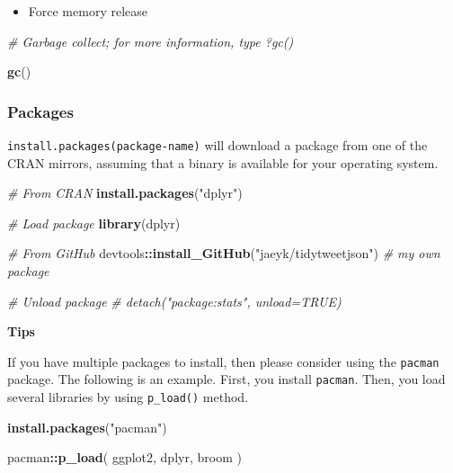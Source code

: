 \documentclass[
]{book}
\newenvironment{Shaded}{\begin{snugshade}}{\end{snugshade}}
\newcommand{\CommentTok}[1]{\textcolor[rgb]{0.56,0.35,0.01}{\textit{#1}}}
\newcommand{\FunctionTok}[1]{\textcolor[rgb]{0.13,0.29,0.53}{\textbf{#1}}}
\newcommand{\NormalTok}[1]{#1}
\newcommand{\SpecialCharTok}[1]{\textcolor[rgb]{0.81,0.36,0.00}{\textbf{#1}}}
\newcommand{\StringTok}[1]{\textcolor[rgb]{0.31,0.60,0.02}{#1}}
\providecommand{\tightlist}{%
  \setlength{\itemsep}{0pt}\setlength{\parskip}{0pt}}
\begin{document}
\begin{itemize}
\tightlist
\item
  Force memory release
\end{itemize}

\begin{Shaded}
\begin{Highlighting}[]
\CommentTok{\# Garbage collect; for more information, type ?gc()}

\FunctionTok{gc}\NormalTok{()}
\end{Highlighting}
\end{Shaded}

\subsubsection{Packages}\label{packages}

\texttt{install.packages(package-name)} will download a package from one of the CRAN mirrors, assuming that a binary is available for your operating system.

\begin{Shaded}
\begin{Highlighting}[]
\CommentTok{\# From CRAN}
\FunctionTok{install.packages}\NormalTok{(}\StringTok{"dplyr"}\NormalTok{)}

\CommentTok{\# Load package}
\FunctionTok{library}\NormalTok{(dplyr)}

\CommentTok{\# From GitHub}
\NormalTok{devtools}\SpecialCharTok{::}\FunctionTok{install\_GitHub}\NormalTok{(}\StringTok{"jaeyk/tidytweetjson"}\NormalTok{) }\CommentTok{\# my own package}

\CommentTok{\# Unload package}
\CommentTok{\# detach("package:stats", unload=TRUE)}
\end{Highlighting}
\end{Shaded}

\textbf{Tips}

If you have multiple packages to install, then please consider using the \texttt{pacman} package. The following is an example. First, you install \texttt{pacman}. Then, you load several libraries by using \texttt{p\_load()} method.

\begin{Shaded}
\begin{Highlighting}[]
\FunctionTok{install.packages}\NormalTok{(}\StringTok{"pacman"}\NormalTok{)}

\NormalTok{pacman}\SpecialCharTok{::}\FunctionTok{p\_load}\NormalTok{(}
\NormalTok{  ggplot2,}
\NormalTok{  dplyr,}
\NormalTok{  broom}
\NormalTok{)}
\end{Highlighting}
\end{Shaded}
\end{document}
